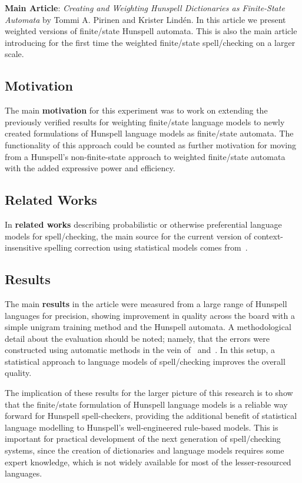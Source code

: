 \documentclass[officiallayout,final]{unihelcompling}
\begin{document}
\textbf{Main Article}: \emph{Creating and Weighting Hunspell Dictionaries as
Finite-State Automata} by Tommi A. Pirinen and Krister Lindén. In this article
we present weighted versions of finite\-/state Hunspell automata. This is also
the main article introducing for the first time the weighted finite\-/state
spell\-/checking on a larger scale.

\subsection{Motivation}

The main \textbf{motivation} for this experiment was to work on extending the
previously verified results for weighting finite\-/state language models to
newly created formulations of Hunspell language models as finite\-/state
automata. The functionality of this approach could be counted as further
motivation for moving from a Hunspell's non-finite-state approach to weighted
finite\-/state automata with the added expressive power and efficiency.

\subsection{Related Works}

In \textbf{related works} describing probabilistic or otherwise preferential
language models for spell\-/checking, the main source for the current version
of context-insensitive spelling correction using statistical models comes
from~\citet{church1991probability}.

\subsection{Results}

The main \textbf{results} in the article were measured from a large range of
Hunspell languages for precision, showing improvement in quality across the
board with a simple unigram training method and the Hunspell automata. A
methodological detail about the evaluation should be noted; namely, that the
errors were constructed using automatic methods in the vein
of~\citep{bigert2003autoeval} and~\citep{bigert2005automatic}. In this setup,
a statistical approach to language models of spell\-/checking improves the
overall quality.

The implication of these results for the larger picture of this research is to
show that the finite\-/state formulation of Hunspell language models is a
reliable way forward for Hunspell spell-checkers, providing the additional
benefit of statistical language modelling to Hunspell's well-engineered
rule-based models. This is important for practical development of the next
generation of spell\-/checking systems, since the creation of dictionaries and
language models requires some expert knowledge, which is not widely available
for most of the lesser-resourced languages.
\end{document}
